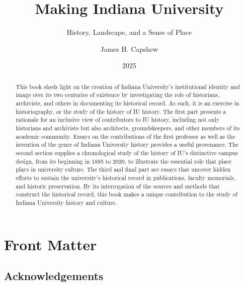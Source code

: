 \documentclass[
  letterpaper,
]{scrbook}
\title{Making Indiana University}
\subtitle{History, Landscape, and a Sense of Place}
\author{James H. Capshew}
\date{2025}
\renewcommand*\contentsname{Table of contents}
\newcommand\contentsname{Table of contents}
\begin{document}
\frontmatter
\maketitle
\begin{abstract}
This book sheds light on the creation of Indiana University's
institutional identity and image over its two centuries of existence by
investigating the role of historians, archivists, and others in
documenting its historical record. As such, it is an exercise in
historiography, or the study of the history of IU history. The first
part presents a rationale for an inclusive view of contributors to IU
history, including not only historians and archivists but also
architects, groundskeepers, and other members of its academic community.
Essays on the contributions of the first professor as well as the
invention of the genre of Indiana University history provides a useful
provenance. The second section supplies a chronological study of the
history of IU's distinctive campus design, from its beginning in 1885 to
2020, to illustrate the essential role that place plays in university
culture. The third and final part are essays that uncover hidden efforts
to sustain the university's historical record in publications, faculty
memorials, and historic preservation. By its interrogation of the
sources and methods that construct the historical record, this book
makes a unique contribution to the study of Indiana University history
and culture.
\end{abstract}

\renewcommand*\contentsname{Table of contents}
{
\setcounter{tocdepth}{2}
\tableofcontents
}

\mainmatter
{}

\chapter{Front Matter}\label{front-matter}

\section{Acknowledgements}\label{acknowledgements}
\end{document}

